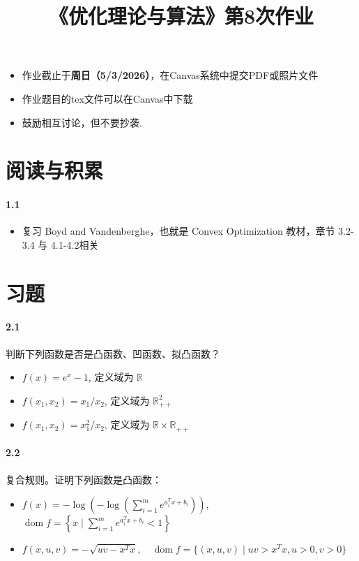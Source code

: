 \documentclass[12pt,a4paper]{article}
\begin{document}
\title{
{《优化理论与算法》第8次作业
}
}
\date{}


\maketitle
\begin{itemize}
	\item 作业截止于{\bf 周日（5/3/2026）}，在Canvas系统中提交PDF或照片文件
	\item 作业题目的tex文件可以在Canvas中下载
	\item 鼓励相互讨论，但不要抄袭.
\end{itemize}

\section{阅读与积累}
\paragraph{1.1}
\begin{itemize}
	\item 复习 Boyd and Vandenberghe，也就是 Convex Optimization 教材，章节 3.2-3.4 与 4.1-4.2相关
\end{itemize}

\section{习题}

\paragraph{2.1}
 判断下列函数是否是凸函数、凹函数、拟凸函数？
\begin{itemize}
  \item[(a)] $f(x) = e^x - 1$, 定义域为 $\mathbb{R}$
  \item[(b)] $f(x_1, x_2) = x_1 / x_2$, 定义域为 $\mathbb{R}_{++}^2$
  \item[(c)] $f(x_1, x_2) = x_1^2 / x_2$, 定义域为 $\mathbb{R} \times \mathbb{R}_{++}$
\end{itemize}



\paragraph{2.2} 复合规则。证明下列函数是凸函数：
\begin{itemize}
  \item[(a)] $f(x) = -\log\left(-\log\left(\sum_{i=1}^m e^{a_i^T x + b_i}\right)\right)$, \quad $\operatorname{dom} f = \left\{ x \mid \sum_{i=1}^m e^{a_i^T x + b_i} < 1 \right\}$
  \item[(b)] $f(x,u,v) = -\sqrt{uv - x^T x}, \quad \operatorname{dom} f = \{(x,u,v) \mid uv > x^T x, u > 0, v > 0\}$
\end{itemize}
\end{document}

